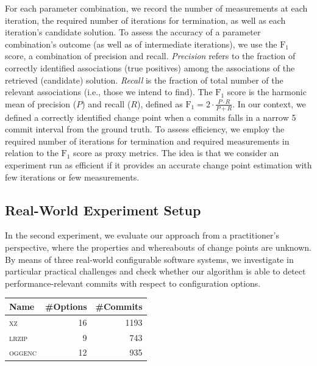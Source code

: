 \documentclass[sigconf]{acmart}
\begin{document}
	For each parameter combination, we record the number of measurements at each iteration, the required number of iterations for termination, as well as each iteration's candidate solution. To assess the accuracy of a parameter combination's outcome (as well as of intermediate iterations), we use the $\text{F}_1$ score, a combination of precision and recall. \emph{Precision} refers to the fraction of correctly identified associations (true positives) among the associations of the retrieved (candidate) solution. \emph{Recall} is the fraction of total number of the relevant associations (i.e., those we intend to find). The $\text{F}_1$ score is the harmonic mean of precision ($P$) and recall ($R$), defined as $\text{F}_1 = 2\cdot\frac{P \cdot R}{P + R}$.	In our context, we defined a correctly identified change point when a commits falls in a narrow 5 commit interval from the ground truth.
	To assess efficiency, we employ the required number of iterations for termination and required measurements in relation to the $\text{F}_1$ score as proxy metrics. The idea is that we consider an experiment run as efficient if it provides an accurate change point estimation with few iterations or few measurements.
	
	\subsection{Real-World Experiment Setup}
	In the second experiment, we evaluate our approach from a practitioner's perspective, where the properties and whereabouts of change points are unknown.  By means of three real-world configurable software systems, we investigate in particular practical challenges and check whether our algorithm is able to detect performance-relevant commits with respect to configuration options. 
	
	\begin{table}
		\centering
		\label{tab:properties}
		\begin{tabular}{lrr}
			\toprule
			\textbf{Name} & \textbf{\#Options} & \textbf{\#Commits}\\
			\midrule
			\textsc{xz} & 16 & 1193\\
			\textsc{lrzip} & 9 & 743 \\
			\textsc{oggenc} & 12 & 935\\
			\bottomrule
		\end{tabular}
	\end{table}
	
\end{document}
